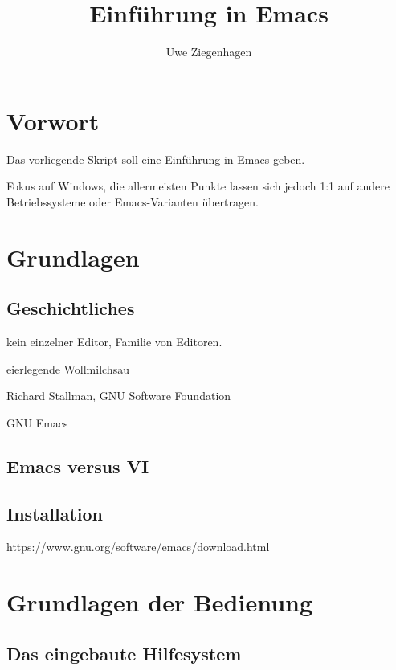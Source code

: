 \documentclass[12pt,ngerman]{scrbook}
\title{Einführung in Emacs}
\author{Uwe Ziegenhagen}
\begin{document}
\maketitle

\frontmatter

\tableofcontents


\chapter*{Vorwort}

Das vorliegende Skript soll eine Einführung in Emacs geben.

Fokus auf Windows, die allermeisten Punkte lassen sich jedoch 1:1 auf andere Betriebssysteme oder Emacs-Varianten übertragen.

\mainmatter


\chapter{Grundlagen}

\section{Geschichtliches}

kein einzelner Editor, Familie von Editoren. 

eierlegende Wollmilchsau

Richard Stallman, GNU Software Foundation

GNU Emacs

\section{Emacs versus VI}



\section{Installation}

https://www.gnu.org/software/emacs/download.html

\chapter{Grundlagen der Bedienung}

\section{Das eingebaute Hilfesystem}
\end{document}
